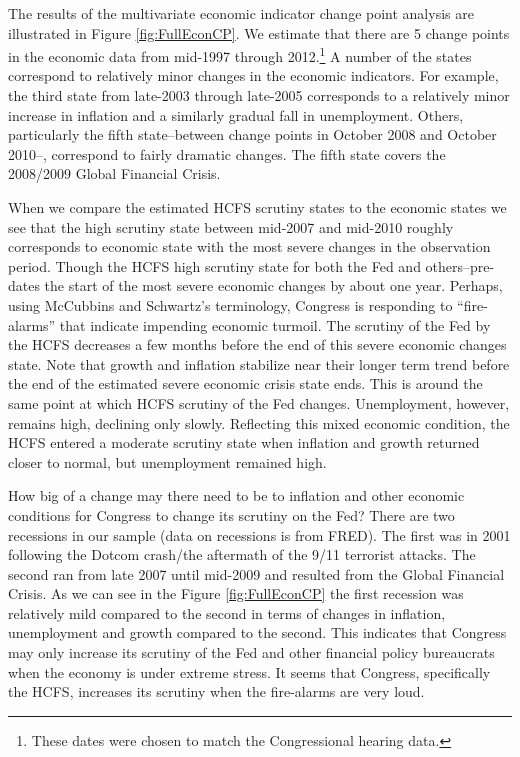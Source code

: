 \documentclass[a4paper]{article}\usepackage[]{graphicx}\usepackage[]{color}
\begin{document}
The results of the multivariate economic indicator change point analysis are illustrated in Figure \ref{fig:FullEconCP}. We estimate that there are 5 change points in the economic data from mid-1997 through 2012.\footnote{These dates were chosen to match the Congressional hearing data.} A number of the states correspond to relatively minor changes in the economic indicators. For example, the third state from late-2003 through late-2005 corresponds to a relatively minor increase in inflation and a similarly gradual fall in unemployment. Others, particularly the fifth state--between change points in October 2008 and October 2010--, correspond to fairly dramatic changes. The fifth state covers the 2008/2009 Global Financial Crisis.

When we compare the estimated HCFS scrutiny states to the economic states we see that the high scrutiny state between mid-2007 and mid-2010 roughly corresponds to economic state with the most severe changes in the observation period. Though the HCFS high scrutiny state for both the Fed and others--pre-dates the start of the most severe economic changes by about one year. Perhaps, using McCubbins and Schwartz's \citeyearpar{Mccubbins1984} terminology, Congress is responding to ``fire-alarms'' that indicate impending economic turmoil. The scrutiny of the Fed by the HCFS decreases a few months before the end of this severe economic changes state. Note that growth and inflation stabilize near their longer term trend before the end of the estimated severe economic crisis state ends. This is around the same point at which HCFS scrutiny of the Fed changes. Unemployment, however, remains high, declining only slowly. Reflecting this mixed economic condition, the HCFS entered a moderate scrutiny state when inflation and growth returned closer to normal, but unemployment remained high.

How big of a change may there need to be to inflation and other economic conditions for Congress to change its scrutiny on the Fed? There are two recessions in our sample (data on recessions is from FRED). The first was in 2001 following the Dotcom crash/the aftermath of the 9/11 terrorist attacks. The second ran from late 2007 until mid-2009 and resulted from the Global Financial Crisis. As we can see in the Figure \ref{fig:FullEconCP} the first recession was relatively mild compared to the second in terms of changes in inflation, unemployment and growth compared to the second. This indicates that Congress may only increase its scrutiny of the Fed and other financial policy bureaucrats when the economy is under extreme stress. It seems that Congress, specifically the HCFS, increases its scrutiny when the fire-alarms are very loud.
\end{document}
